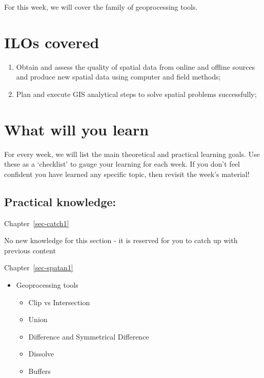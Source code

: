 \documentclass[
  letterpaper,
  DIV=11,
  numbers=noendperiod]{scrreprt}
\providecommand{\tightlist}{%
  \setlength{\itemsep}{0pt}\setlength{\parskip}{0pt}}\usepackage{longtable,booktabs,array}
\begin{document}
For this week, we will cover the family of geoprocessing tools.

\section*{ILOs covered}\label{ilos-covered-4}


\begin{enumerate}
\def\labelenumi{\arabic{enumi}.}
\setcounter{enumi}{1}
\item
  Obtain and assess the quality of spatial data from online and offline
  sources and produce new spatial data using computer and field methods;
\item
  Plan and execute GIS analytical steps to solve spatial problems
  successfully;
\end{enumerate}

\section*{What will you learn}\label{what-will-you-learn-4}


For every week, we will list the main theoretical and practical learning
goals. Use these as a `checklist' to gauge your learning for each week.
If you don't feel confident you have learned any specific topic, then
revisit the week's material!

\subsection*{Practical knowledge:}\label{practical-knowledge-4}

Chapter~\ref{sec-catch1}

No new knowledge for this section - it is reserved for you to catch up
with previous content

Chapter~\ref{sec-spatan1}

\begin{itemize}
\tightlist
\item
  Geoprocessing tools

  \begin{itemize}
  \tightlist
  \item
    Clip vs Intersection
  \item
    Union
  \item
    Difference and Symmetrical Difference
  \item
    Dissolve
  \item
    Buffers
  \end{itemize}
\end{itemize}
\end{document}

